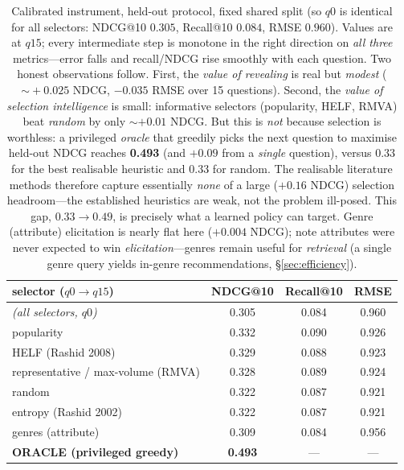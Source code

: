 \begin{table}[h]\centering\small
\begin{tabular}{lccc}
\toprule
selector ($q0\!\to\!q15$) & NDCG@10 & Recall@10 & RMSE\\
\midrule
\emph{(all selectors, $q0$)} & 0.305 & 0.084 & 0.960\\
\midrule
popularity & 0.332 & 0.090 & 0.926\\
HELF (Rashid 2008) & 0.329 & 0.088 & 0.923\\
representative / max-volume (RMVA) & 0.328 & 0.089 & 0.924\\
random & 0.322 & 0.087 & 0.921\\
entropy (Rashid 2002) & 0.322 & 0.087 & 0.921\\
genres (attribute) & 0.309 & 0.084 & 0.956\\
\midrule
\textbf{ORACLE (privileged greedy)} & \textbf{0.493} & --- & ---\\
\bottomrule
\end{tabular}
\caption{Calibrated instrument, held-out protocol, fixed shared split (so $q0$ is identical for all selectors:
NDCG@10 $0.305$, Recall@10 $0.084$, RMSE $0.960$). Values are at $q15$; every intermediate step is monotone in the
right direction on \emph{all three} metrics---error falls and recall/NDCG rise smoothly with each question. Two
honest observations follow. First, the \emph{value of revealing} is real but \emph{modest} ($\sim\!+0.025$ NDCG,
$-0.035$ RMSE over 15 questions). Second, the \emph{value of selection intelligence} is small: informative selectors
(popularity, HELF, RMVA) beat \emph{random} by only ${\sim}{+}0.01$ NDCG. But this is \emph{not} because selection is
worthless: a privileged \emph{oracle} that greedily picks the next question to maximise held-out NDCG reaches
\textbf{0.493} (and $+0.09$ from a \emph{single} question), versus $0.33$ for the best realisable heuristic and $0.33$
for random. The realisable literature methods therefore capture essentially \emph{none} of a large ($+0.16$ NDCG)
selection headroom---the established heuristics are weak, not the problem ill-posed. This gap, $0.33\!\to\!0.49$, is
precisely what a learned policy can target. Genre (attribute) elicitation is nearly flat here ($+0.004$ NDCG); note
attributes were never expected to win \emph{elicitation}---genres remain useful for \emph{retrieval} (a single genre
query yields in-genre recommendations, \S\ref{sec:efficiency}).}
\label{tab:s4panel}
\end{table}

